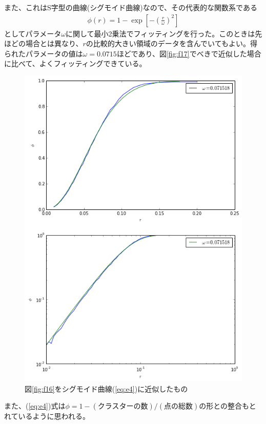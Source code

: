 また、これはS字型の曲線(シグモイド曲線)なので、その代表的な関数系である
\begin{eqnarray}\phi (r) = 1 - \exp \left[ -  \left( \frac{r}{\omega} \right)^{2} \right]\label{eq:e4}
\end{eqnarray}
としてパラメータ$\omega$に関して最小2乗法でフィッティングを行った。このときは先ほどの場合とは異なり、$r$の比較的大きい領域のデータを含んでいてもよい。得られたパラメータの値は$\omega=0.0715$ほどであり、図\ref{fig:f17}でべきで近似した場合に比べて、よくフィッティングできている。
\begin{figure}[H]
    \begin{center}
        \includegraphics[width=12.5cm]{../img/r_phi_1_sigmoid.png}
        \caption{図\ref{fig:f16}をシグモイド曲線(\ref{eq:e4})に近似したもの}
        \label{fig:f18}
    \end{center}
\end{figure}
また、(\ref{eq:e4})式は$\phi = 1- (\text{クラスターの数})/(\text{点の総数})$の形との整合もとれているように思われる。


% 
% 


